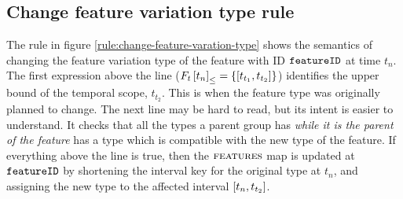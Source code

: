 \subsection{Change feature variation type rule}
\label{sub:change-feature-variation-type-rule}
The rule in figure \vref{rule:change-feature-varation-type} shows the semantics of changing the feature variation type of the feature with ID $\texttt{featureID}$ at time $t_n$. The first expression above the line ($\containing{F_t}{t_n} = \set{\interval{t_{t_1}}{t_{t_2}}}$) identifies the upper bound of the temporal scope, $t_{t_2}$. This is when the feature type was originally planned to change. The next line may be hard to read, but its intent is easier to understand. It checks that all the types a parent group has \emph{while it is the parent of the feature} has a type which is compatible with the new type of the feature. If everything above the line is true, then the $\textsc{features}{}$ map is updated at $\texttt{featureID}$ by shortening the interval key for the original type at $t_n$, and assigning the new type to the affected interval $\interval{t_n}{t_{t_2}}$. 


